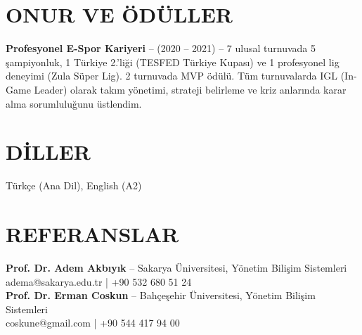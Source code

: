 \documentclass[a4paper,8pt]{article}
\begin{document}
\section{ONUR VE ÖDÜLLER}
{\small
\textbf{Profesyonel E-Spor Kariyeri} -- (2020 -- 2021) -- 7 ulusal turnuvada 5 şampiyonluk, 1 Türkiye 2.'liği (TESFED Türkiye Kupası) ve 1 profesyonel lig deneyimi (Zula Süper Lig). 2 turnuvada MVP ödülü. Tüm turnuvalarda IGL (In-Game Leader) olarak takım yönetimi, strateji belirleme ve kriz anlarında karar alma sorumluluğunu üstlendim.
}

\section{DİLLER}
{\small Türkçe (Ana Dil), English (A2)}

\section{REFERANSLAR}
{\small
\textbf{Prof. Dr. Adem Akbıyık} -- Sakarya Üniversitesi, Yönetim Bilişim Sistemleri\\
adema@sakarya.edu.tr | +90 532 680 51 24\\[3pt]
\textbf{Prof. Dr. Erman Coskun} -- Bahçeşehir Üniversitesi, Yönetim Bilişim Sistemleri\\
coskune@gmail.com | +90 544 417 94 00
}
\end{document}
